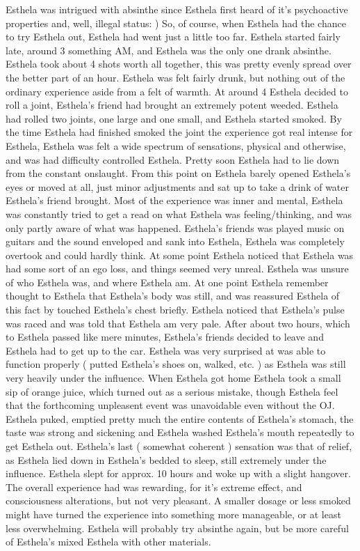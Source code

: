 \documentclass[12pt]{book}
\begin{document}
Esthela was intrigued with absinthe since Esthela first heard of it's psychoactive properties and, well, illegal status: ) So, of course, when Esthela had the chance to try Esthela out, Esthela had went just a little too far. Esthela started fairly late, around 3 something AM, and Esthela was the only one drank absinthe. Esthela took about 4 shots worth all together, this was pretty evenly spread over the better part of an hour. Esthela was felt fairly drunk, but nothing out of the ordinary experience aside from a felt of warmth. At around 4 Esthela decided to roll a joint, Esthela's friend had brought an extremely potent weeded. Esthela had rolled two joints, one large and one small, and Esthela started smoked. By the time Esthela had finished smoked the joint the experience got real intense for Esthela, Esthela was felt a wide spectrum of sensations, physical and otherwise, and was had difficulty controlled Esthela. Pretty soon Esthela had to lie down from the constant onslaught. From this point on Esthela barely opened Esthela's eyes or moved at all, just minor adjustments and sat up to take a drink of water Esthela's friend brought. Most of the experience was inner and mental, Esthela was constantly tried to get a read on what Esthela was feeling/thinking, and was only partly aware of what was happened. Esthela's friends was played music on guitars and the sound enveloped and sank into Esthela, Esthela was completely overtook and could hardly think. At some point Esthela noticed that Esthela was had some sort of an ego loss, and things seemed very unreal. Esthela was unsure of who Esthela was, and where Esthela am. At one point Esthela remember thought to Esthela that Esthela's body was still, and was reassured Esthela of this fact by touched Esthela's chest briefly. Esthela noticed that Esthela's pulse was raced and was told that Esthela am very pale. After about two hours, which to Esthela passed like mere minutes, Esthela's friends decided to leave and Esthela had to get up to the car. Esthela was very surprised at was able to function properly ( putted Esthela's shoes on, walked, etc. ) as Esthela was still very heavily under the influence. When Esthela got home Esthela took a small sip of orange juice, which turned out as a serious mistake, though Esthela feel that the forthcoming unpleasent event was unavoidable even without the OJ. Esthela puked, emptied pretty much the entire contents of Esthela's stomach, the taste was strong and sickening and Esthela washed Esthela's mouth repeatedly to get Esthela out. Esthela's last ( somewhat coherent ) sensation was that of relief, as Esthela lied down in Esthela's bedded to sleep, still extremely under the influence. Esthela slept for approx. 10 hours and woke up with a slight hangover. The overall experience had was rewarding, for it's extreme effect, and consciousness alterations, but not very pleasant. A smaller dosage or less smoked might have turned the experience into something more manageable, or at least less overwhelming. Esthela will probably try absinthe again, but be more careful of Esthela's mixed Esthela with other materials.
\end{document}
